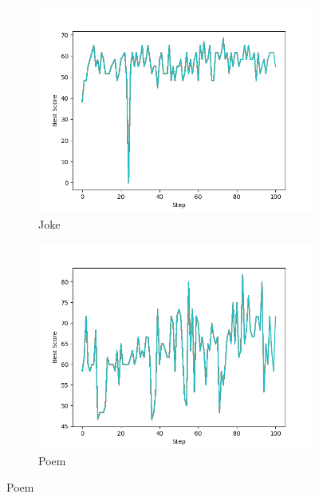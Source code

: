 \documentclass[phd,electronic,oneside,twosidetoc,letterpaper,chaptercenter,parttop,lof]{byumsphd}
\begin{document}
\begin{figure}[t!]
  \centering
  \begin{subfigure}[b]{0.45\textwidth}
    \includegraphics[width=\textwidth]{images/cc_prompting/joke_best_scores_over_time.png}
    \caption{Joke}
    \label{fig:joke}
  \end{subfigure}
  \hfill
  \begin{subfigure}[b]{0.45\textwidth}
    \includegraphics[width=\textwidth]{images/cc_prompting/poem_best_scores_over_time.png}
    \caption{Poem}
    \label{fig:poem}
  \end{subfigure}

  \vspace{0.5em}


\end{figure}
\end{document}
